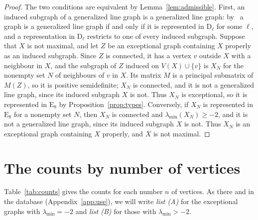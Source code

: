 \documentclass[11pt]{article}
\newcommand\cS{{\mathcal S}}
\theoremstyle{definition}
\newcommand{\typ}[1]{\mathrm{#1}}
\newcommand{\lmin}{\lambda_{\min}}
\begin{document}
\begin{proof}
The two conditions are equivalent by Lemma~\ref{lem:admissible}. First, an induced subgraph of a
generalized line graph is a generalized line graph: by~\cite[Theorem~4.2]{CGSS} a graph is a
generalized line graph if and only if it is represented in $\typ D_\ell$ for some $\ell$, and a
representation in $\typ D_\ell$ restricts to one of every induced subgraph. Suppose that $X$ is
not maximal, and let $Z$ be an exceptional graph containing $X$ properly as an induced subgraph.
Since $Z$ is connected, it has a vertex $v$ outside $X$ with a neighbour in $X$, and the subgraph
of $Z$ induced on $V(X)\cup\{v\}$ is $X_N$ for the nonempty set $N$ of neighbours of $v$ in $X$.
Its matrix $M$ is a principal submatrix of $M(Z)$, so it is positive semidefinite; $X_N$ is
connected, and it is not a generalized line graph, since its induced subgraph $X$ is not. Thus
$X_N$ is exceptional, so it is represented in $\typ E_8$ by Proposition~\ref{prop:types}.
Conversely, if $X_N$ is represented in $\typ E_8$ for a nonempty set $N$, then $X_N$ is connected
and $\lmin(X_N)\ge-2$, and it is not a generalized line graph, since its induced subgraph $X$ is
not. Thus $X_N$ is an exceptional graph containing $X$ properly, and $X$ is not maximal.
\end{proof}

\section{The counts by number of vertices}\label{sec:counts}

Table~\ref{tab:counts} gives the counts for each number $n$ of vertices. As there and in the
database (Appendix~\ref{app:use}), we will write \textsl{list (A)} for the exceptional graphs with
$\lmin=-2$ and \textsl{list (B)} for those with $\lmin>-2$.

\begin{table}[htbp]
\centering
\small

\caption{The numbers of graphs on $n$ vertices that are connected and represented in $\typ E_8$
(the size of the level $\cS_n$), exceptional with $\lmin=-2$ (list (A)), exceptional with
$\lmin>-2$ (list (B)), exceptional, and maximal exceptional.}\label{tab:counts}
\end{table}
\end{document}
